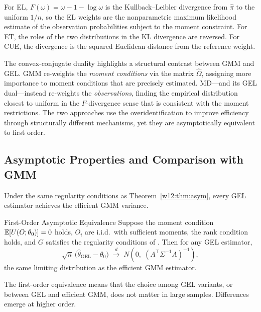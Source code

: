 \documentclass[master.tex]{subfiles}
\begin{document}
For EL, $F(\omega) = \omega - 1 - \log\omega$ is the
Kullback--Leibler divergence from $\hat\pi$ to the uniform $1/n$,
so the EL weights are the nonparametric maximum likelihood estimate
of the observation probabilities subject to the moment constraint.
For ET, the roles of the two distributions in the KL divergence are
reversed.  For CUE, the divergence is the squared Euclidean
distance from the reference weight.

\begin{remark}
The convex-conjugate duality highlights a structural contrast between
GMM and GEL.  GMM re-weights the \emph{moment conditions} via the
matrix $\hat\Omega$, assigning more importance to moment conditions
that are precisely estimated.  MD---and its GEL dual---instead
re-weights the \emph{observations}, finding the empirical
distribution closest to uniform in the $F$-divergence sense that is
consistent with the moment restrictions.  The two approaches use the
overidentification to improve efficiency through structurally
different mechanisms, yet they are asymptotically equivalent to
first order.
\end{remark}

\subsection{Asymptotic Properties and Comparison with GMM}
\label{w12:sec:gel:asymp}

Under the same regularity conditions as Theorem~\ref{w12:thm:asym},
every GEL estimator achieves the efficient GMM variance.

\begin{thm}{First-Order Asymptotic Equivalence \citep{neweysmith2004}}
\label{w12:thm:gel-asymp}
Suppose the moment condition $\mathbb{E}[U(O;\theta_0)] = 0$ holds, $O_i$
are i.i.d.\ with sufficient moments, the rank condition holds, and
$G$ satisfies the regularity conditions of
\citet{neweysmith2004}.  Then for any GEL estimator,
\[
  \sqrt{n}\,\bigl(\hat\theta_{\mathrm{GEL}} - \theta_0\bigr)
  \;\xrightarrow{d}\;
  N\!\left(0,\; (A^\top\Sigma^{-1}A)^{-1}\right),
\]
the same limiting distribution as the efficient GMM estimator.
\end{thm}

The first-order equivalence means that the choice among GEL variants,
or between GEL and efficient GMM, does not matter in large samples.
Differences emerge at higher order.
\end{document}
